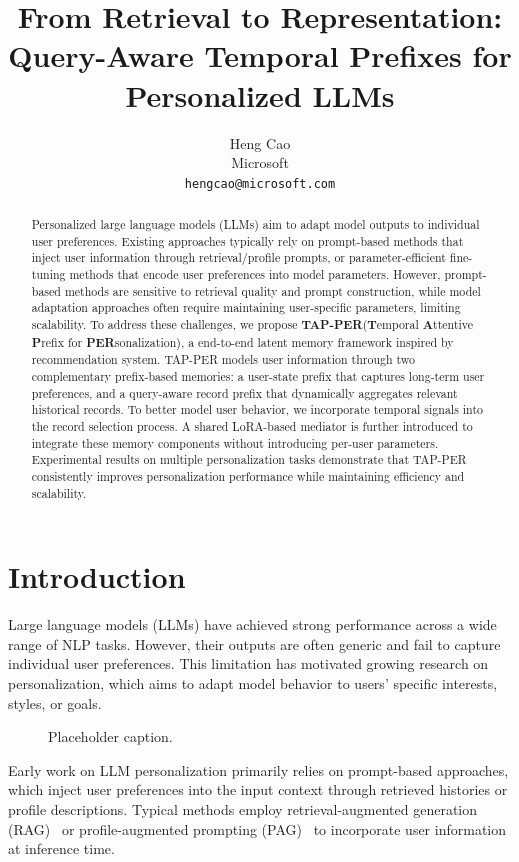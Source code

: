 \documentclass[11pt]{article}
\title{From Retrieval to Representation: Query-Aware Temporal Prefixes for Personalized LLMs}
\author{Heng Cao \\
  Microsoft \\
  \texttt{hengcao@microsoft.com}}
\begin{document}
\maketitle

\begin{abstract}
Personalized large language models (LLMs) aim to adapt model outputs to individual user preferences. Existing approaches typically rely on prompt-based methods that inject user information through retrieval/profile prompts, or parameter-efficient fine-tuning methods that encode user preferences into model parameters. However, prompt-based methods are sensitive to retrieval quality and prompt construction, while model adaptation approaches often require maintaining user-specific parameters, limiting scalability. To address these challenges, we propose \textbf{TAP-PER}(\textbf{T}emporal \textbf{A}ttentive \textbf{P}refix for \textbf{PER}sonalization), a end-to-end latent memory framework inspired by recommendation system. TAP-PER models user information through two complementary prefix-based memories: a user-state prefix that captures long-term user preferences, and a query-aware record prefix that dynamically aggregates relevant historical records. To better model user behavior, we incorporate temporal signals into the record selection process. A shared LoRA-based mediator is further introduced to integrate these memory components without introducing per-user parameters. Experimental results on multiple personalization tasks demonstrate that TAP-PER consistently improves personalization performance while maintaining efficiency and scalability.
\end{abstract}

\section{Introduction}
Large language models (LLMs) have achieved strong performance across a wide range of NLP tasks. However, their outputs are often generic and fail to capture individual user preferences. This limitation has motivated growing research on personalization, which aims to adapt model behavior to users’ specific interests, styles, or goals.

\begin{figure}[t]
  \centering
  \caption{Placeholder caption.}
  \label{fig:placeholder}
\end{figure}

Early work on LLM personalization primarily relies on prompt-based approaches, which inject user preferences into the input context through retrieved histories or profile descriptions. Typical methods employ retrieval-augmented generation (RAG)~\cite{mysore-etal-2024-pearl} or profile-augmented prompting (PAG)~\cite{richardson2023integrating} to incorporate user information at inference time.
\end{document}
